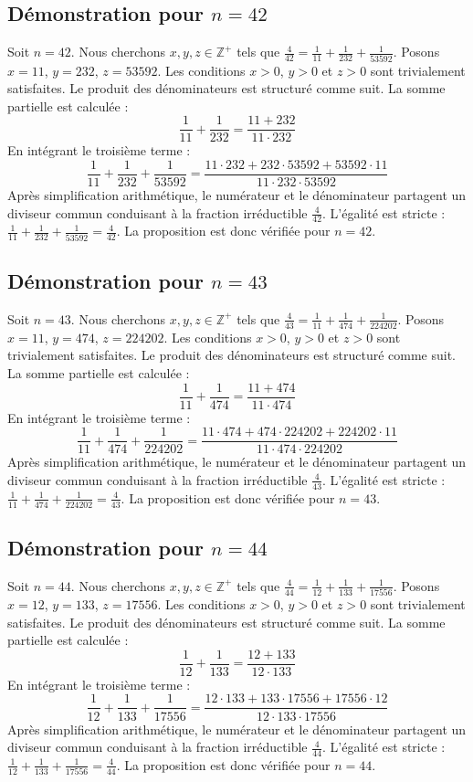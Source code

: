 \documentclass[11pt,a4paper]{article}
\begin{document}
\subsection{Démonstration pour $n = 42$}
Soit $n = 42$. Nous cherchons $x, y, z \in \mathbb{Z}^{+}$ tels que $\frac{4}{42} = \frac{1}{11} + \frac{1}{232} + \frac{1}{53592}$.
Posons $x = 11$, $y = 232$, $z = 53592$.
Les conditions $x > 0$, $y > 0$ et $z > 0$ sont trivialement satisfaites.
Le produit des dénominateurs est structuré comme suit. La somme partielle est calculée :
$$ \frac{1}{11} + \frac{1}{232} = \frac{11+232}{11 \cdot 232} $$
En intégrant le troisième terme :
$$ \frac{1}{11} + \frac{1}{232} + \frac{1}{53592} = \frac{11 \cdot 232 + 232 \cdot 53592 + 53592 \cdot 11}{11 \cdot 232 \cdot 53592} $$
Après simplification arithmétique, le numérateur et le dénominateur partagent un diviseur commun conduisant à la fraction irréductible $\frac{4}{42}$.
L'égalité est stricte : $\frac{1}{11} + \frac{1}{232} + \frac{1}{53592} = \frac{4}{42}$.
La proposition est donc vérifiée pour $n = 42$.
\subsection{Démonstration pour $n = 43$}
Soit $n = 43$. Nous cherchons $x, y, z \in \mathbb{Z}^{+}$ tels que $\frac{4}{43} = \frac{1}{11} + \frac{1}{474} + \frac{1}{224202}$.
Posons $x = 11$, $y = 474$, $z = 224202$.
Les conditions $x > 0$, $y > 0$ et $z > 0$ sont trivialement satisfaites.
Le produit des dénominateurs est structuré comme suit. La somme partielle est calculée :
$$ \frac{1}{11} + \frac{1}{474} = \frac{11+474}{11 \cdot 474} $$
En intégrant le troisième terme :
$$ \frac{1}{11} + \frac{1}{474} + \frac{1}{224202} = \frac{11 \cdot 474 + 474 \cdot 224202 + 224202 \cdot 11}{11 \cdot 474 \cdot 224202} $$
Après simplification arithmétique, le numérateur et le dénominateur partagent un diviseur commun conduisant à la fraction irréductible $\frac{4}{43}$.
L'égalité est stricte : $\frac{1}{11} + \frac{1}{474} + \frac{1}{224202} = \frac{4}{43}$.
La proposition est donc vérifiée pour $n = 43$.
\subsection{Démonstration pour $n = 44$}
Soit $n = 44$. Nous cherchons $x, y, z \in \mathbb{Z}^{+}$ tels que $\frac{4}{44} = \frac{1}{12} + \frac{1}{133} + \frac{1}{17556}$.
Posons $x = 12$, $y = 133$, $z = 17556$.
Les conditions $x > 0$, $y > 0$ et $z > 0$ sont trivialement satisfaites.
Le produit des dénominateurs est structuré comme suit. La somme partielle est calculée :
$$ \frac{1}{12} + \frac{1}{133} = \frac{12+133}{12 \cdot 133} $$
En intégrant le troisième terme :
$$ \frac{1}{12} + \frac{1}{133} + \frac{1}{17556} = \frac{12 \cdot 133 + 133 \cdot 17556 + 17556 \cdot 12}{12 \cdot 133 \cdot 17556} $$
Après simplification arithmétique, le numérateur et le dénominateur partagent un diviseur commun conduisant à la fraction irréductible $\frac{4}{44}$.
L'égalité est stricte : $\frac{1}{12} + \frac{1}{133} + \frac{1}{17556} = \frac{4}{44}$.
La proposition est donc vérifiée pour $n = 44$.
\end{document}
